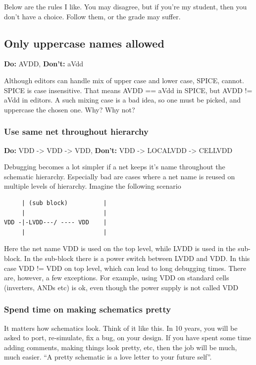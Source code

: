 Below are the rules I like. You may disagree, but if you're my student,
then you don't have a choice. Follow them, or the grade may suffer.

\subsection{Only uppercase names
allowed}\label{only-uppercase-names-allowed}

\textbf{Do:} AVDD, \textbf{Don't:} aVdd

Although editors can handle mix of upper case and lower case, SPICE,
cannot. SPICE is case insensitive. That means AVDD == aVdd in SPICE, but
AVDD != aVdd in editors. A such mixing case is a bad idea, so one must
be picked, and uppercase the chosen one. Why? Why not?

\subsubsection{Use same net throughout
hierarchy}\label{use-same-net-throughout-hierarchy}

\textbf{Do:} VDD -\textgreater{} VDD -\textgreater{} VDD,
\textbf{Don't:} VDD -\textgreater{} LOCALVDD -\textgreater{} CELLVDD

Debugging becomes a lot simpler if a net keeps it's name throughout the
schematic hierarchy. Especially bad are cases where a net name is reused
on multiple levels of hierarchy. Imagine the following scenario

\begin{verbatim}
     | (sub block)          |
     |                      |
VDD -|-LVDD---/ ---- VDD    |
     |                      |
\end{verbatim}

Here the net name VDD is used on the top level, while LVDD is used in
the sub-block. In the sub-block there is a power switch between LVDD and
VDD. In this case VDD != VDD on top level, which can lead to long
debugging times. There are, however, a few exceptions. For example,
using VDD on standard cells (inverters, ANDs etc) is ok, even though the
power supply is not called VDD

\subsubsection{Spend time on making schematics
pretty}\label{spend-time-on-making-schematics-pretty}

It matters how schematics look. Think of it like this. In 10 years, you
will be asked to port, re-simulate, fix a bug, on your design. If you
have spent some time adding comments, making things look pretty, etc,
then the job will be much, much easier. ``A pretty schematic is a love
letter to your future self''.

